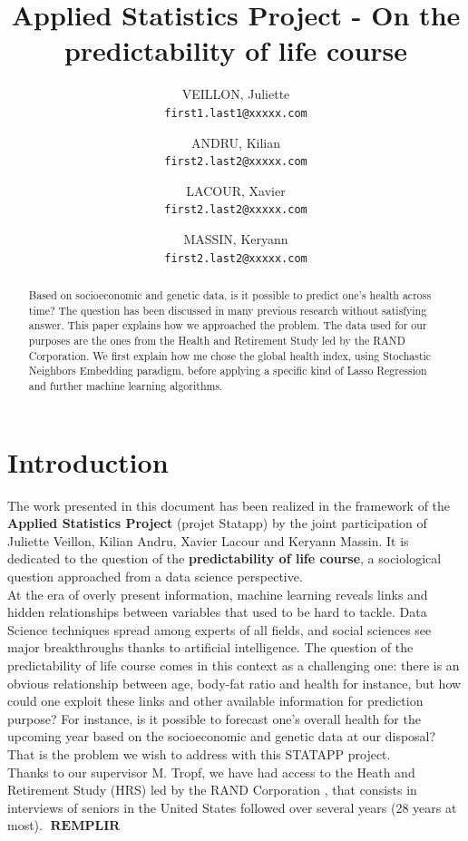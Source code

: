 \documentclass[]{article}
\title{Applied Statistics Project - On the predictability of life course}
\author{
	VEILLON, Juliette\\
	\texttt{first1.last1@xxxxx.com}
	\and
	ANDRU, Kilian\\
	\texttt{first2.last2@xxxxx.com}
	\and
	LACOUR, Xavier\\
	\texttt{first2.last2@xxxxx.com}
	\and
	MASSIN, Keryann\\
	\texttt{first2.last2@xxxxx.com}
}
\DeclareMathOperator*{\towrite}{\textbf{REMPLIR}}
\begin{document}
\newcommand{\sklearn}{\textbf{scikit-learn}}
\maketitle
\begin{abstract}
	Based on socioeconomic and genetic data, is it possible to predict one's health across time? The question has been discussed in many previous research without satisfying answer. This paper explains how we approached the problem. The data used for our purposes are the ones from the Health and Retirement Study led by the RAND Corporation. We first explain how me chose the global health index, using Stochastic Neighbors Embedding paradigm, before applying a specific kind of Lasso Regression and further machine learning algorithms.
\end{abstract}
\newpage
\tableofcontents
\newpage
\section{Introduction}
The work presented in this document has been realized in the framework of the \textbf{Applied Statistics Project} (projet Statapp) by the joint participation of Juliette Veillon, Kilian Andru, Xavier Lacour and Keryann Massin. It is dedicated to the question of the \textbf{predictability of life course}, a sociological question approached from a data science perspective.\\

\noindent
At the era of overly present information, machine learning reveals links and hidden relationships between variables that used to be hard to tackle. Data Science techniques spread among experts of all fields, and social sciences see major breakthroughs thanks to artificial intelligence. The question of the predictability of life course comes in this context as a challenging one: there is an obvious relationship between age, body-fat ratio and health for instance, but how could one exploit these links and other available information for prediction purpose? For instance, is it possible to forecast one's overall health for the upcoming year based on the socioeconomic and genetic data at our disposal? That is the problem we wish to address with this STATAPP project.\\

\noindent
Thanks to our supervisor M. Tropf, we have had access to the Heath and Retirement Study (HRS) led by the RAND Corporation \cite{hrs2014}, that consists in interviews of seniors in the United States followed over several years (28 years at most). $\towrite$\\
\end{document}
